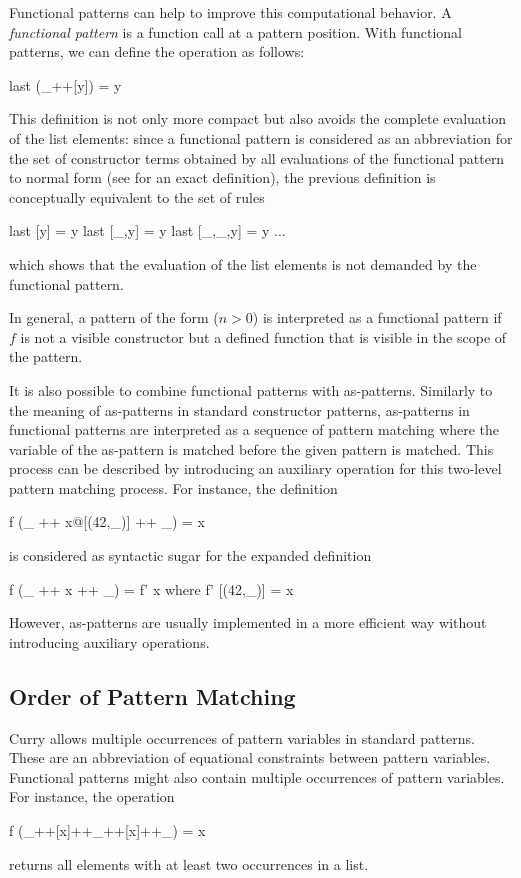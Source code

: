 Functional patterns can help to improve this computational behavior.
A \emph{functional pattern}
is a function call at a pattern position. With functional patterns,
we can define the operation  as follows:
\begin{curry}
last (_++[y]) = y
\end{curry}
This definition is not only more compact but also avoids the complete
evaluation of the list elements: since a functional pattern is considered
as an abbreviation for the set of constructor terms obtained by all
evaluations of the functional pattern to normal form (see
\cite{AntoyHanus05LOPSTR} for an exact definition), the previous
definition is conceptually equivalent to the set of rules
\begin{curry}
last [y] = y
last [_,y] = y
last [_,_,y] = y
$\ldots$
\end{curry}
which shows that the evaluation of the list elements is not demanded
by the functional pattern.

In general, a pattern of the form  ($n>0$)
is interpreted as a functional pattern if $f$ is not a visible constructor
but a defined function that is visible in the scope of the pattern.

It is also possible to combine functional patterns with
as-patterns.
Similarly to the meaning of as-patterns
in standard constructor patterns,
as-patterns in functional patterns are interpreted
as a sequence of pattern matching where the variable of the as-pattern
is matched before the given pattern is matched.
This process can be described by introducing an auxiliary operation
for this two-level pattern matching process.
For instance, the definition
\begin{curry}
f (_ ++ x@[(42,_)] ++ _) = x
\end{curry}
is considered as syntactic sugar for the expanded definition
\begin{curry}
f (_ ++ x ++ _) = f' x
 where
  f' [(42,_)] = x
\end{curry}
However, as-patterns are usually implemented
in a more efficient way without introducing auxiliary operations.

\subsection{Order of Pattern Matching}

Curry allows multiple occurrences of pattern variables
in standard patterns. These are an abbreviation of equational constraints
between pattern variables.
Functional patterns might also contain multiple occurrences of
pattern variables.
For instance, the operation
\begin{curry}
f (_++[x]++_++[x]++_) = x
\end{curry}
returns all elements with at least two occurrences in a list.

